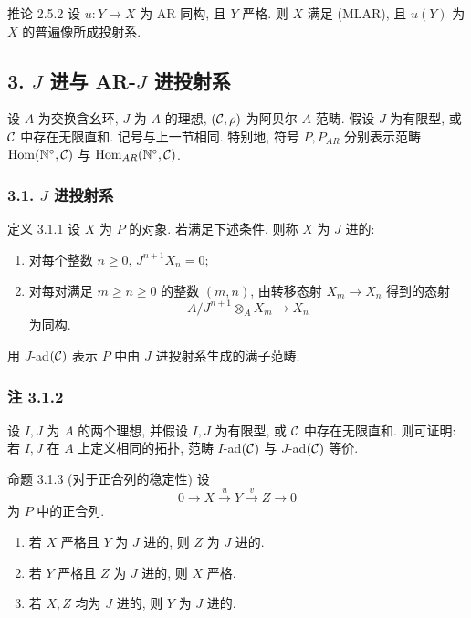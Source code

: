 \begin{statement}{推论 2.5.2}
设 $u:Y\to X$ 为 AR 同构, 且 $Y$ 严格. 则 $X$ 满足 (MLAR), 且 $u(Y)$ 为 $X$ 的普遍像所成投射系.
\end{statement}

\subsection*{3. $J$ 进与 AR-$J$ 进投射系}
设 $A$ 为交换含幺环, $J$ 为 $A$ 的理想, $(\mathcal C,\rho)$ 为阿贝尔 $A$ 范畴. 假设 $J$ 为有限型, 或 $\mathcal C$ 中存在无限直和. 记号与上一节相同. 特别地, 符号 $P,P_{AR}$ 分别表示范畴 $\operatorname{Hom}(\mathbb N^\circ,\mathcal C)$ 与 $\operatorname{Hom}_{AR}(\mathbb N^\circ,\mathcal C)$.

\subsubsection*{3.1. $J$ 进投射系}
\begin{statement}{定义 3.1.1}
设 $X$ 为 $P$ 的对象. 若满足下述条件, 则称 $X$ 为 $J$ 进的:
\begin{enumerate}[label=(\roman*)]
\item 对每个整数 $n\ge0$, $J^{n+1}X_n=0$;
\item 对每对满足 $m\ge n\ge0$ 的整数 $(m,n)$, 由转移态射 $X_m\to X_n$ 得到的态射
\[
A/J^{n+1}\otimes_A X_m\longrightarrow X_n
\]
为同构.
\end{enumerate}
\end{statement}
用 $J$-ad$(\mathcal C)$ 表示 $P$ 中由 $J$ 进投射系生成的满子范畴.

\subsubsection*{注 3.1.2}
设 $I,J$ 为 $A$ 的两个理想, 并假设 $I,J$ 为有限型, 或 $\mathcal C$ 中存在无限直和. 则可证明: 若 $I,J$ 在 $A$ 上定义相同的拓扑, 范畴 $I$-ad$(\mathcal C)$ 与 $J$-ad$(\mathcal C)$ 等价.

\begin{statement}{命题 3.1.3 (对于正合列的稳定性)}
设
\[
0\longrightarrow X\stackrel{u}{\longrightarrow}Y\stackrel{v}{\longrightarrow}Z\longrightarrow0
\]
为 $P$ 中的正合列.
\begin{enumerate}[label=(\roman*)]
\item 若 $X$ 严格且 $Y$ 为 $J$ 进的, 则 $Z$ 为 $J$ 进的.
\item 若 $Y$ 严格且 $Z$ 为 $J$ 进的, 则 $X$ 严格.
\item 若 $X,Z$ 均为 $J$ 进的, 则 $Y$ 为 $J$ 进的.
\end{enumerate}
\end{statement}

